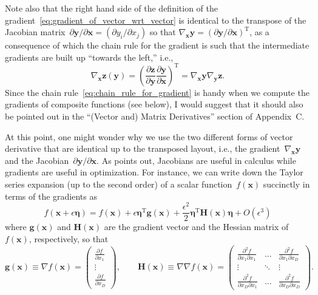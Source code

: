 \documentclass[12pt,a4paper]{article}
\begin{document}
Note also that the right hand side of the definition of
the gradient~\eqref{eq:gradient_of_vector_wrt_vector} is identical to
the transpose of the Jacobian matrix~$\partial\mathbf{y}/\partial\mathbf{x} =
\left( \partial y_i/\partial x_j \right)$
so that $\nabla_{\mathbf{x}} \mathbf{y} =
\left( \partial\mathbf{y}/\partial\mathbf{x} \right)^{\operatorname{T}}$,
as a consequence of which the chain rule for the gradient is such that the intermediate gradients
are built up ``towards the left,'' i.e.,
\begin{equation}
\nabla_{\mathbf{x}} \mathbf{z}(\mathbf{y}) =
\left(
  \frac{\partial\mathbf{z}}{\partial\mathbf{y}}
  \frac{\partial\mathbf{y}}{\partial\mathbf{x}}
\right)^{\operatorname{T}} =
\nabla_\mathbf{x} \mathbf{y} \nabla_\mathbf{y} \mathbf{z}.
\label{eq:chain_rule_for_gradient}
\end{equation}
Since the chain rule~\eqref{eq:chain_rule_for_gradient} is handy
when we compute the gradients of composite functions (see below),
I would suggest that it should also be pointed out in
the ``(Vector and) Matrix Derivatives'' section of Appendix~C.

At this point,
one might wonder why we use the two different forms of vector derivative that are identical
up to the transposed layout, i.e.,
the gradient~$\nabla_{\mathbf{x}} \mathbf{y}$ and
the Jacobian~$\partial\mathbf{y}/\partial\mathbf{x}$.
As \citet{Minka:OldNewMatrixAlgebra} points out,
Jacobians are useful in calculus while gradients are useful in optimization.
For instance, we can write down the Taylor series expansion
(up to the second order) of a scalar function~$f(\mathbf{x})$ succinctly
in terms of the gradients as
\begin{equation}
f(\mathbf{x} + \epsilon\bm{\eta}) =
f(\mathbf{x})
+ \epsilon\bm{\eta}^{\operatorname{T}} \mathbf{g}(\mathbf{x})
+ \frac{\epsilon^2}{2} {\bm{\eta}}^{\operatorname{T}} \mathbf{H}(\mathbf{x}) \bm{\eta}
+ O \left( \epsilon^3 \right)
\end{equation}
where $\mathbf{g}(\mathbf{x})$ and $\mathbf{H}(\mathbf{x})$ are
the gradient vector and the Hessian matrix of $f(\mathbf{x})$, respectively, so that
\begin{equation}
\mathbf{g}(\mathbf{x}) \equiv \nabla f(\mathbf{x}) =
\begin{pmatrix}
\frac{\partial f}{\partial x_{1}} \\
\vdots \\
\frac{\partial f}{\partial x_{D}}
\end{pmatrix} , \qquad
\mathbf{H}(\mathbf{x}) \equiv \nabla\nabla f(\mathbf{x}) =
\begin{pmatrix}
\frac{\partial^{2} f}{\partial x_{1} \partial x_{1}} &
\hdots &
\frac{\partial^{2} f}{\partial x_{1} \partial x_{D}} \\
\vdots & \ddots & \vdots \\
\frac{\partial^{2} f}{\partial x_{D} \partial x_{1}} &
\hdots &
\frac{\partial^{2} f}{\partial x_{D} \partial x_{D}}
\end{pmatrix} .
\end{equation}
\end{document}
